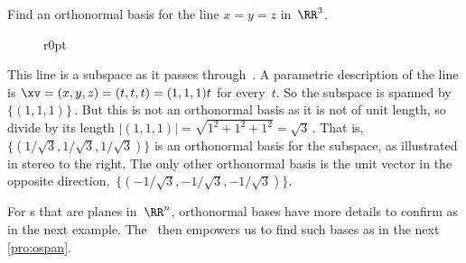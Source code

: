 \begin{example} \label{eg:orthbas1}
Find an orthonormal basis for the line \(x=y=z\) in~\(\RR^3\).

\begin{solution} 
\begin{figure}r{0pt}
 {}
\end{figure}
This line is a subspace as it passes through~\ov.
A parametric description of the line is \(\xv=(x,y,z)=(t,t,t)=(1,1,1)t\) for every~\(t\). 
So the subspace is spanned by~\(\{(1,1,1)\}\)\,.
But this is not an orthonormal basis as it is not of unit length, so divide by its length \(|(1,1,1)|=\sqrt{1^2+1^2+1^2}=\sqrt3\)\,.
That is, \(\{(1/{\sqrt3},1/{\sqrt3},1/{\sqrt3})\}\) is an orthonormal basis for the subspace, as illustrated in stereo to the right.
The only other orthonormal basis is the unit vector in the opposite direction,~\(\{(-1/{\sqrt3},-1/{\sqrt3},-1/{\sqrt3})\}\).
\aqed

\end{solution}
\end{example}


For s that are planes in~\(\RR^n\), orthonormal bases have more details to confirm as in the next example.
The \svd\ then empowers us to find such bases as in the next \cref{pro:ospan}.

